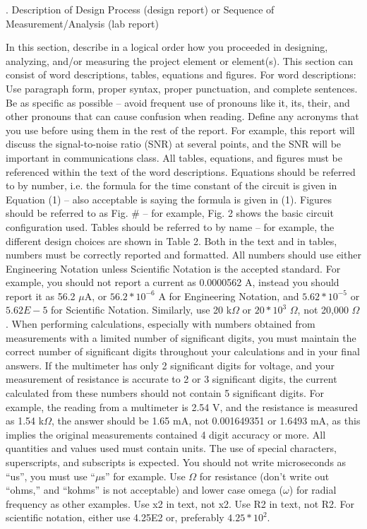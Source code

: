 \documentclass[11pt]{ECEtemp}
\begin{document}
. Description of Design Process (design report) or Sequence of Measurement/Analysis (lab report)

In this section, describe in a logical order how you proceeded in designing, analyzing, and/or measuring the project element or element(s). This section can consist of word descriptions, tables, equations and figures.
\underline{}{For word descriptions:} Use paragraph form, proper syntax, proper punctuation, and complete sentences. Be as specific as possible – avoid frequent use of pronouns like it, its, their, and other pronouns that can cause confusion when reading. Define any acronyms that you use before using them in the rest of the report. For example, this report will discuss the signal-to-noise ratio (SNR) at several points, and the SNR will be important in communications class. All tables, equations, and figures must be referenced within the text of the word descriptions. Equations should be referred to by number, i.e. the formula for the time constant of the circuit is given in Equation (1) – also acceptable is saying the formula is given in (1). Figures should be referred to as Fig. \# -- for example, Fig. 2 shows the basic circuit configuration used. Tables should be referred to by name – for example, the different design choices are shown in Table 2.
Both in the text and in tables, numbers must be correctly reported and formatted. All numbers should use either Engineering Notation unless Scientific Notation is the accepted standard. For example, you should not report a current as 0.0000562 A, instead you should report it as 56.2 $\mu$A, or $56.2*10^{-6}$ A for Engineering Notation, and $5.62*10^{-5}$ or $5.62E-5$ for Scientific Notation. Similarly, use 20 k$\Omega$ or $20*10^3$ $\Omega$, not 20,000 $\Omega$. When performing calculations, especially with numbers obtained from measurements with a limited number of significant digits, you must maintain the correct number of significant digits throughout your calculations and in your final answers. If the multimeter has only 2 significant digits for voltage, and your measurement of resistance is accurate to 2 or 3 significant digits, the current calculated from these numbers should not contain 5 significant digits. For example, the reading from a multimeter is 2.54 V, and the resistance is measured as 1.54 k$\Omega$, the answer should be 1.65 mA, not 0.001649351 or 1.6493 mA, as this implies the original measurements contained 4 digit accuracy or more. All quantities and values used must contain units.
The use of special characters, superscripts, and subscripts is expected. You should not write microseconds as ``us'', you must use ``$\mu$s'' for example. Use $\Omega$ for resistance (don’t write out ``ohms,'' and ``kohms'' is not acceptable) and lower case omega ($\omega$) for radial frequency as other examples. Use x2 in text, not x2. Use R2 in text, not R2. For scientific notation, either use 4.25E2 or, preferably $4.25*10^2$.
\end{document}
